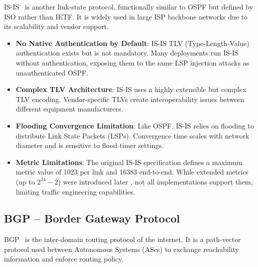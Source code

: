 \documentclass[12pt,a4paper]{article}
\begin{document}
IS-IS~\cite{rfc1142,rfc1195} is another link-state protocol, functionally
similar to OSPF but defined by ISO rather than IETF. It is widely used in
large ISP backbone networks due to its scalability and vendor support.

\begin{warningbox}
\begin{itemize}[itemsep=4pt]
  \item \textbf{No Native Authentication by Default}: IS-IS TLV (Type-Length-Value)
  authentication exists but is not mandatory. Many deployments run IS-IS without
  authentication, exposing them to the same LSP injection attacks as unauthenticated OSPF.

  \item \textbf{Complex TLV Architecture}: IS-IS uses a highly extensible but
  complex TLV encoding. Vendor-specific TLVs create interoperability issues
  between different equipment manufacturers.

  \item \textbf{Flooding Convergence Limitation}: Like OSPF, IS-IS relies on
  flooding to distribute Link State Packets (LSPs). Convergence time scales with
  network diameter and is sensitive to flood timer settings.

  \item \textbf{Metric Limitations}: The original IS-IS specification defines a
  maximum metric value of 1023 per link and 16383 end-to-end. While extended
  metrics (up to $2^{24}-2$) were introduced later \cite{fortz2002}, not all
  implementations support them, limiting traffic engineering capabilities.
\end{itemize}
\end{warningbox}

\subsection{BGP -- Border Gateway Protocol}

BGP~\cite{rfc4271} is the inter-domain routing protocol of the internet. It is
a path-vector protocol used between Autonomous Systems (ASes) to exchange
reachability information and enforce routing policy.
\end{document}
